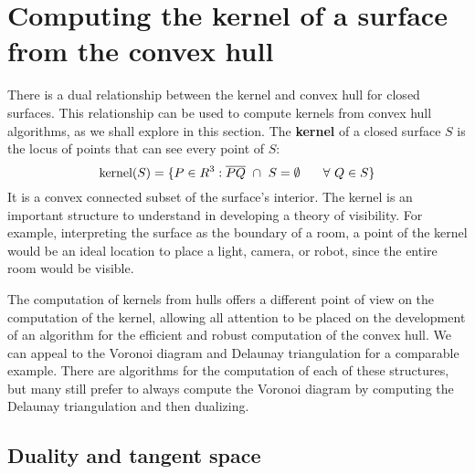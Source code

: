 \documentclass[12pt]{article}
\newcommand{\seg}[1]{\mbox{$\overline{#1}$}}
\begin{document}

\section{Computing the kernel of a surface from the convex hull}

There is a dual relationship between the kernel and convex hull
for closed surfaces.
This relationship can be used to compute kernels from convex hull algorithms,
as we shall explore in this section.
The {\bf kernel} of a closed surface $S$ is the locus of points that can see every
point of $S$:
\[
\mbox{kernel}(S) = \{ P \in R^3: \seg{PQ} \ \cap \ S = \emptyset 
		\hspace{.25in} \forall \ Q \in S \}
\]
It is a convex connected subset of the surface's interior.
The kernel is an important structure to understand in developing a theory of visibility.
For example, interpreting the surface as the boundary of a room,
a point of the kernel would be an ideal location to place a light, camera, or robot,
since the entire room would be visible.

The computation of kernels from hulls
offers a different point of view on the computation of the kernel,
allowing all attention to be placed on the development of an algorithm
for the efficient and robust computation of the convex hull.
We can appeal to the Voronoi diagram and Delaunay triangulation for a comparable example.
There are algorithms for the computation of each of these structures,
but many still prefer to always compute the Voronoi diagram by computing
the Delaunay triangulation and then dualizing.


\subsection{Duality and tangent space}
\label{sec:duality}
\end{document}
